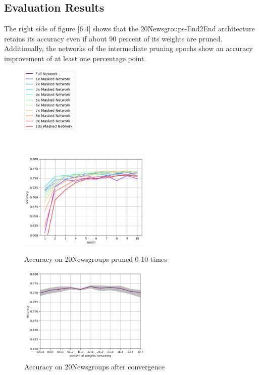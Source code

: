 \subsection*{Evaluation Results}
The right side of figure [6.4] shows that the 20Newsgroups-End2End architecture retains its accuracy even if about 90 percent of its weights are pruned. Additionally, the networks of the intermediate pruning epochs show an accuracy improvement of at least one percentage point.
\begin{figure}
	\begin{minipage}{0.5\textwidth}
		\centering
		\includegraphics[width=100px]{gfx/7-Evaluation/20Newsgroups_legend.png}
	\end{minipage}
	\begin{minipage}{0.5\textwidth}
		\centering
	\end{minipage}
	\\
	\begin{minipage}{0.5\textwidth}
		\centering
		\includegraphics[height=175px]{gfx/Experiments/Transfer-20Newsgroups-CNN/accuracy/10_iterations.png}
		\caption*{Accuracy on 20Newsgroups pruned 0-10 times}
		\label{fig:CIFAR10accuracy15}
	\end{minipage}\hfill
	\begin{minipage}{0.5\textwidth}
		\centering
		\includegraphics[height=175px]{gfx/Experiments/Transfer-20Newsgroups-CNN/accuracy/converged.png}
		\caption*{Accuracy on 20Newsgroups after convergence}
		\label{?}
	\end{minipage}
\end{figure}

